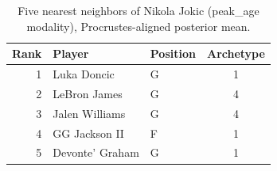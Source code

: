 \begin{table}[htbp]
  \centering\small
  \begin{tabular}{rllc}
    \toprule
    Rank & Player & Position & Archetype \\
    \midrule
    1 & Luka Doncic & G & 1 \\
    2 & LeBron James & G & 4 \\
    3 & Jalen Williams & G & 4 \\
    4 & GG Jackson II & F & 1 \\
    5 & Devonte' Graham & G & 1 \\
    \bottomrule
  \end{tabular}
  \caption{Five nearest neighbors of Nikola Jokic (peak_age modality), Procrustes-aligned posterior mean.}
  \label{tab:Nikola_Jokic_neighbors_peak_age}
\end{table}

